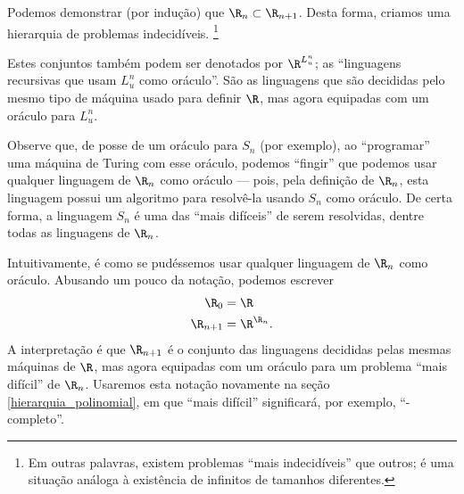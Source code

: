Podemos demonstrar (por indução) que $\R_n \subset \R_{n+1}$.
Desta forma,
criamos uma hierarquia de problemas indecidíveis.
\footnote{
    Em outras palavras,
    existem problemas ``mais indecidíveis'' que outros;
    é uma situação análoga à existência de infinitos de tamanhos diferentes.
}

Estes conjuntos também podem ser denotados por $\R^{L_u^n}$;
as ``linguagens recursivas que usam $L_u^n$ como oráculo''.
São as linguagens que são decididas
pelo mesmo tipo de máquina usado para definir $\R$,
mas agora equipadas com um oráculo para $L_u^n$.

Observe que,
de posse de um oráculo para $S_n$ (por exemplo),
ao ``programar'' uma máquina de Turing com esse oráculo,
podemos ``fingir'' que podemos usar qualquer linguagem de $\R_n$ como oráculo
--- pois, pela definição de $\R_n$,
esta linguagem possui um algoritmo para resolvê-la
usando $S_n$ como oráculo.
De certa forma,
a linguagem $S_n$ é uma das ``mais difíceis'' de serem resolvidas,
dentre todas as linguagens de $\R_n$.

Intuitivamente, é como se pudéssemos usar qualquer linguagem de $\R_n$ como oráculo.
Abusando um pouco da notação,
podemos escrever
\begin{align*}
    \R_0 &= \R \\
    \R_{n+1} &= \R^{\R_n}.
\end{align*}
A interpretação é que $\R_{n+1}$ é o conjunto das linguagens
decididas pelas mesmas máquinas de $\R$,
mas agora equipadas com um oráculo para um problema ``mais difícil'' de $\R_n$.
Usaremos esta notação novamente na seção \ref{hierarquia_polinomial},
em que ``mais difícil'' significará,
por exemplo, ``\NP-completo''.
